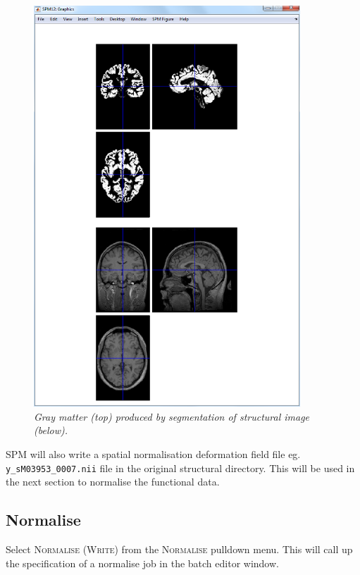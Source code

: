\begin{figure}
\begin{center}
\includegraphics[width=100mm]{faces/gray}
\caption{\em Gray matter (top) produced by segmentation of structural image (below). \label{face_gray}}
\end{center}
\end{figure}

SPM will also write a spatial normalisation deformation field file eg. \texttt{y\_sM03953\_0007.nii} file in the original structural directory. This will be used in the next section to normalise the functional data. 

\subsection{Normalise}

Select \textsc{Normalise (Write)} from the \textsc{Normalise} pulldown menu. This will call up the specification of a normalise job in the batch editor window. 

